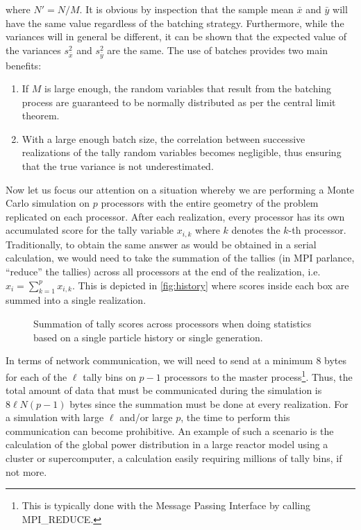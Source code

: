 where $N' = N/M$. It is obvious by inspection that the sample mean $\bar{x}$ and
$\bar{y}$ will have the same value regardless of the batching
strategy. Furthermore, while the variances will in general be different, it can
be shown that the expected value of the variances $s^2_{\bar{x}}$ and
$s^2_{\bar{y}}$ are the same. The use of batches provides two main benefits:
\begin{enumerate}
  \item If $M$ is large enough, the random variables that result from the
    batching process are guaranteed to be normally distributed as per the
    central limit theorem.
  \item With a large enough batch size, the correlation between successive
    realizations of the tally random variables becomes negligible, thus ensuring
    that the true variance is not underestimated.
\end{enumerate}

Now let us focus our attention on a situation whereby we are performing a Monte
Carlo simulation on $p$ processors with the entire geometry of the problem
replicated on each processor. After each realization, every processor has its
own accumulated score for the tally variable $x_{i,k}$ where $k$ denotes the
$k$-th processor. Traditionally, to obtain the same answer as would be obtained
in a serial calculation, we would need to take the summation of the tallies (in
MPI parlance, ``reduce'' the tallies) across all processors at the end of the
realization, i.e. $x_i = \sum_{k=1}^p x_{i,k}$. This is depicted in
\autoref{fig:history} where scores inside each box are summed into a single
realization.
\begin{figure}[ht]
  \centering
  \def\svgwidth{2in}
  
  \caption{Summation of tally scores across processors when doing statistics
    based on a single particle history or single generation.}
  \label{fig:history}
\end{figure}
In terms of network communication, we will need to send at a minimum 8 bytes for
each of the $\ell$ tally bins on $p-1$ processors to the master
process\footnote{This is typically done with the Message Passing Interface by
  calling MPI\_REDUCE.}. Thus, the total amount of data that must be
communicated during the simulation is $8\ell N (p-1)$ bytes since the summation
must be done at every realization. For a simulation with large $\ell$ and/or
large $p$, the time to perform this communication can become prohibitive. An
example of such a scenario is the calculation of the global power distribution
in a large reactor model using a cluster or supercomputer, a calculation easily
requiring millions of tally bins, if not more.

